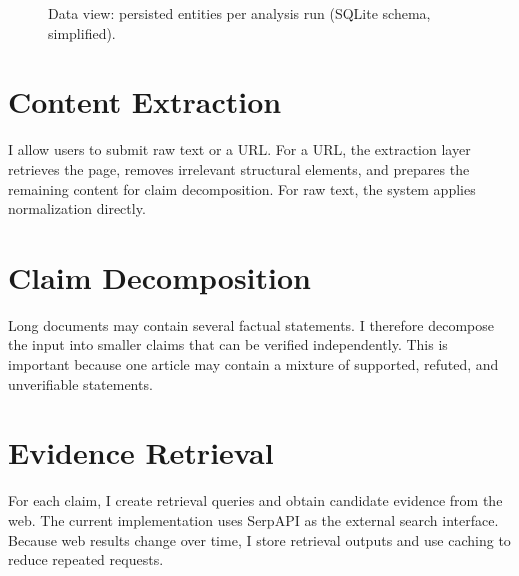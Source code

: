 \documentclass[12pt,a4paper,openany]{report}
\begin{document}
\begin{figure}[H]
\centering
{}
\caption{Data view: persisted entities per analysis run (SQLite schema, simplified).}
\label{fig:dataflow}
\end{figure}

\section{Content Extraction}
I allow users to submit raw text or a URL. For a URL, the extraction layer retrieves the page, removes irrelevant structural elements, and prepares the remaining content for claim decomposition. For raw text, the system applies normalization directly.

\section{Claim Decomposition}
Long documents may contain several factual statements. I therefore decompose the input into smaller claims that can be verified independently. This is important because one article may contain a mixture of supported, refuted, and unverifiable statements.

\section{Evidence Retrieval}
For each claim, I create retrieval queries and obtain candidate evidence from the web. The current implementation uses SerpAPI as the external search interface. Because web results change over time, I store retrieval outputs and use caching to reduce repeated requests.
\end{document}
